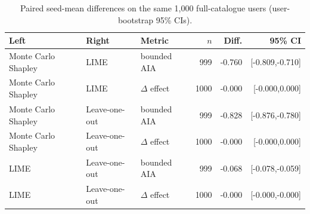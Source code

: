 \begin{table}[!htbp]\centering\scriptsize\setlength{\tabcolsep}{2.5pt}
\caption{Paired seed-mean differences on the same 1,000 full-catalogue users (user-bootstrap 95\% CIs).}
\label{tab:review5-fullcat-paired}
\begin{tabular}{@{}lllrrr@{}}
\toprule
Left & Right & Metric & $n$ & Diff. & 95\% CI \\
\midrule
Monte Carlo Shapley & LIME & bounded AIA & 999 & -0.760 & [-0.809,-0.710] \\
Monte Carlo Shapley & LIME & $\Delta$ effect & 1000 & -0.000 & [-0.000,0.000] \\
Monte Carlo Shapley & Leave-one-out & bounded AIA & 999 & -0.828 & [-0.876,-0.780] \\
Monte Carlo Shapley & Leave-one-out & $\Delta$ effect & 1000 & -0.000 & [-0.000,0.000] \\
LIME & Leave-one-out & bounded AIA & 999 & -0.068 & [-0.078,-0.059] \\
LIME & Leave-one-out & $\Delta$ effect & 1000 & -0.000 & [-0.000,-0.000] \\
\bottomrule
\end{tabular}
\end{table}
